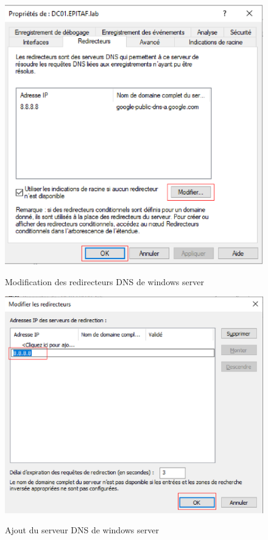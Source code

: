\begin{figure}[h!]
	\begin{center}
		\caption{Modification des redirecteurs DNS de windows server}
		\includegraphics[scale=0.8]{WS_Screenshots/50.png}
		\label{Funcs_WinS/22}
	\end{center}
\end{figure}
\FloatBarrier

\begin{figure}[h!]
	\begin{center}
		\caption{Ajout du serveur DNS de windows server}
		\includegraphics[scale=0.7]{WS_Screenshots/51.png}
		\label{Funcs_WinS/23}
	\end{center}
\end{figure}
\FloatBarrier

